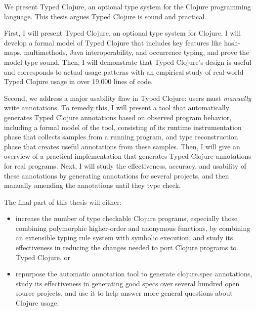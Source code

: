 We present Typed Clojure, an optional type system for the Clojure programming language.
This thesis argues Typed Clojure is sound and practical.

First, I will present Typed Clojure, an optional type system for Clojure.
I will develop a formal model of Typed Clojure that includes
key features like hash-maps, multimethods, Java interoperability, and occurrence typing,
and prove the model type sound.
Then, I will demonstrate that Typed Clojure's design is useful and corresponds to actual usage patterns
with an empirical study of real-world Typed Clojure usage in over 19,000 lines of code.

Second, we address a major usability flaw in Typed Clojure: users must \emph{manually}
write annotations.
To remedy this, 
I will present a tool that automatically generates Typed Clojure annotations based on observed
program behavior, including
a formal model of the tool, consisting of its runtime instrumentation phase that
collects samples from a running program, and type reconstruction phase
that creates useful annotations from these samples.
Then, I will give an overview of a practical implementation that generates Typed Clojure annotations for
real programs.
Next, I will study the effectiveness, accuracy, and usability of these annotations
by generating annotations for several projects, and then manually amending the annotations
until they type check.

The final part of this thesis will either:
\begin{itemize}
  \item increase the number of type checkable Clojure programs, especially those
    combining polymorphic higher-order and anonymous functions, by combining
    an extensible typing rule system with symbolic execution, and study its effectiveness
    in reducing the changes needed to port Clojure programs to Typed Clojure, or
  \item repurpose the automatic annotation tool to generate clojure.spec annotations,
    study its effectiveness in generating good specs over several
    hundred open source projects, and use it to help answer more
    general questions about Clojure usage.
\end{itemize}

